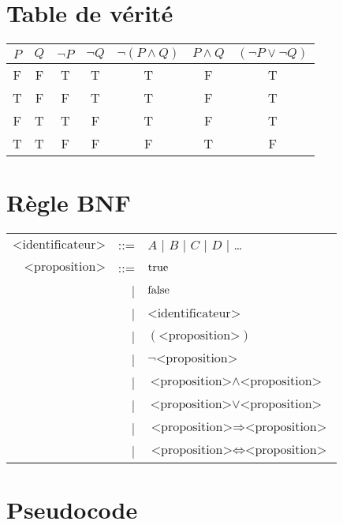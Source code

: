 \section*{Table de vérité}
\begin{center}
	\begin{tabular}{cc|ccccc}
		$P$ & $Q$ & $\lnot P$ & $\lnot Q$ & $\lnot( P \land Q)$ & $P \land Q$ & $ (\lnot P \lor \lnot Q)$\\
		\hline
		F&F&T&T&T&F&T\\
		T&F&F&T&T&F&T\\
		F&T&T&F&T&F&T\\
		T&T&F&F&F&T&F\\
	\end{tabular}
\end{center}

\section*{Règle BNF}
\begin{tabular}{rrl}
  $\textrm{<identificateur>}$ & ::= & $A$ | $B$ | $C$ | $D$ | \dots \\
  $\textrm{<proposition>}$
  & ::= & $\mathrm{true}$ \\
  & | & $\mathrm{false}$ \\
  & | & $\textrm{<identificateur>}$ \\
  & | & $(\textrm{<proposition>})$ \\
  & | & $\lnot \textrm{<proposition>}$ \\
  & | & $\textrm{<proposition>} \land \textrm{<proposition>}$ \\
  & | & $\textrm{<proposition>} \lor \textrm{<proposition>}$ \\
  & | & $\textrm{<proposition>} \Rightarrow \textrm{<proposition>}$ \\
  & | & $\textrm{<proposition>} \Leftrightarrow \textrm{<proposition>}$
\end{tabular}

\section*{Pseudocode}

\begin{algorithm}[H]
\end{algorithm}

